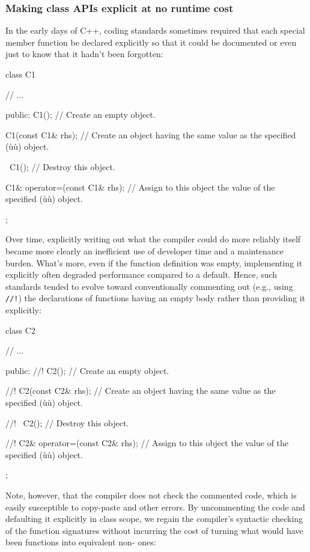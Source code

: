 \subsubsection[Making class APIs explicit at no runtime cost]{Making class APIs explicit at no runtime cost}\label{making-class-apis-explicit-at-no-runtime-cost}

In the early days of C++, coding standards sometimes
required that each special member function be declared explicitly so
that it could be documented or even just to know that it hadn't been
forgotten:

\begin{emcppslisting}
class C1
{
     // ...

public:
   C1();
       // Create an empty object.

   C1(const C1& rhs);
       // Create an object having the same value as the specified (ù{}ù) object.

   ~C1();
       // Destroy this object.

   C1& operator=(const C1& rhs);
       // Assign to this object the value of the specified (ù{}ù) object.
};
\end{emcppslisting}

\noindent Over time, explicitly writing out what the compiler
could do more reliably itself became more clearly an inefficient use of developer time and a maintenance burden.
What's more, even if the function definition was empty, implementing it
explicitly often degraded performance compared to a  default. Hence, such
standards tended to evolve toward conventionally commenting out (e.g.,
using \lstinline|//!|)
the declarations of functions having an empty
body rather than providing it explicitly:

\begin{emcppslisting}
class C2
{
     // ...

public:
   //! C2();
       // Create an empty object.

   //! C2(const C2& rhs);
       // Create an object having the same value as the specified (ù{}ù) object.

   //! ~C2();
       // Destroy this object.

   //! C2& operator=(const C2& rhs);
       // Assign to this object the value of the specified (ù{}ù) object.
};
\end{emcppslisting}

\noindent Note, however, that the compiler does not check the commented code, which is easily susceptible to copy-paste and other errors. By
uncommenting the code and defaulting it explicitly in class scope, we
regain the compiler's syntactic checking of the function signatures
without incurring the cost of turning what would have been
 functions into equivalent
non- ones:

